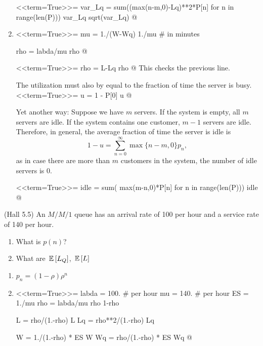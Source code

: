 \begin{question}
\begin{solution}
\begin{enumerate}
<<term=True>>=
var_Lq = sum((max(n-m,0)-Lq)**2*P[n] for n in range(len(P)))
var_Lq
sqrt(var_Lq)
@ 

\item 

<<term=True>>=
mu = 1./(W-Wq)
1./mu # in minutes

rho = labda/mu
rho
@ 

<<term=True>>=
rho = L-Lq
rho
@ 
This checks the previous line.

The utilization must also by equal to the fraction of time the server is busy. 
<<term=True>>=
u = 1 - P[0]
u
@ 

Yet another way: Suppose we have $m$ servers. If the system is empty,
all $m$ servers are idle. If the system contains one customer, $m-1$
servers are idle. Therefore, in general, the average fraction of time
the server is idle is
\begin{equation*}
1- u = \sum_{n=0}^\infty \max\{n-m, 0\}  p_n,
\end{equation*}
as in case there are more than $m$ customers in the system, the
number of idle servers is $0$.


<<term=True>>=
idle = sum( max(m-n,0)*P[n] for n in range(len(P)))
idle
@ 
  \end{enumerate}
   \end{solution}
 
\end{question}

\begin{question}
  (Hall 5.5) An $M/M/1$ queue has an arrival rate of 100 per hour and
  a service rate of 140 per hour.
  \begin{enumerate}
  \item What is $p(n)$?
\item What are $\,\mathbb{E}\left[L_Q\right]$, $\,\mathbb{E}\left[L\right]$ 
\end{enumerate}

\begin{solution}
  \begin{enumerate}
  \item 
$p_n = (1-\rho)\rho^n$

\item 

<<term=True>>=
labda = 100. # per hour
mu = 140. # per hour
ES = 1./mu
rho = labda/mu
rho 
1-rho

L = rho/(1.-rho)
L
Lq = rho**2/(1.-rho)
Lq

W = 1./(1.-rho) * ES
W
Wq = rho/(1.-rho) * ES
Wq
@ 
  \end{enumerate}
  \end{solution}
\end{question}

